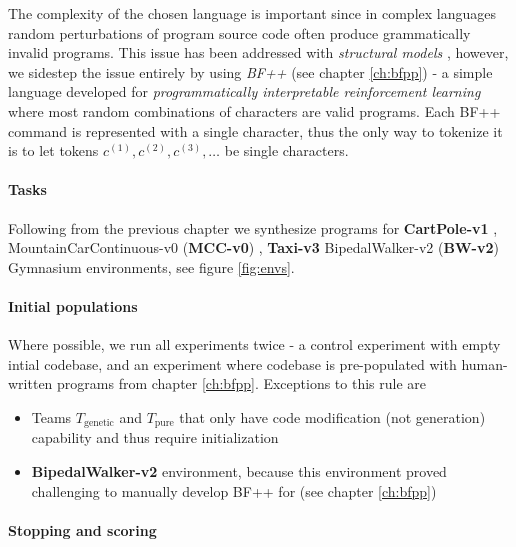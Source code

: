 
The complexity of the chosen language is important since in complex languages random perturbations of program source code often produce grammatically invalid programs.
This issue has been addressed with \emph{structural models} \cite{grammargp,structural} \cite[chapter 4]{genprog1}, however, we sidestep the issue entirely by using \emph{BF++} (see chapter \ref{ch:bfpp}) - a simple language developed for \emph{programmatically interpretable reinforcement learning} where most random combinations of characters are valid programs.
Each BF++ command is represented with a single character, thus the only way to tokenize it is to let tokens $c^{(1)},c^{(2)},c^{(3)},\dots$ be single characters.

\paragraph{Tasks}
\label{sec:tasks}

Following from the previous chapter we synthesize programs for \textbf{CartPole-v1} \cite{cartpole}, MountainCarContinuous-v0 (\textbf{MCC-v0}) \cite{mountain_car}, \textbf{Taxi-v3} \cite{taxi} BipedalWalker-v2 (\textbf{BW-v2})  Gymnasium \cite{towersGymnasiumStandardInterface2024} environments, see figure \ref{fig:envs}.

\paragraph{Initial populations}

Where possible, we run all experiments twice - a control experiment with empty intial codebase, and an experiment where codebase is pre-populated with human-written programs from chapter \ref{ch:bfpp}.
Exceptions to this rule are 
\begin{itemize}
    \item Teams $T_\text{genetic}$ and $T_\text{pure}$ that only have code modification (not generation) capability and thus require initialization 
    \item \textbf{BipedalWalker-v2} environment, because this environment proved challenging to manually develop BF++ for (see chapter \ref{ch:bfpp})
\end{itemize}

\paragraph{Stopping and scoring}

